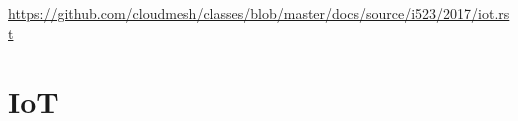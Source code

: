\begin{fileremark}\url{https://github.com/cloudmesh/classes/blob/master/docs/source/i523/2017/iot.rst}\end{fileremark}
\section{IoT}\label{iot}
